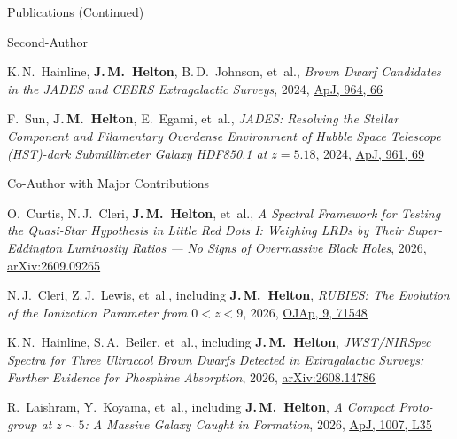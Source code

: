 \documentclass{JMH_CV}
\begin{document}
\begin{rSection}{Publications (Continued)}
\begin{rSubsection}{Second-Author}{}{}{}
\begin{etaremune}
    \item K.\,N.~Hainline, \textbf{J.\,M.~Helton}, B.\,D.~Johnson, et~al., \textit{Brown Dwarf Candidates in the JADES and CEERS Extragalactic Surveys}, 2024, \href{https://www.scixplorer.org/abs/2024ApJ...964...66H/abstract}{\ul{ApJ, 964, 66}}
    
    \item F.~Sun, \textbf{J.\,M.~Helton}, E.~Egami, et~al., \textit{JADES: Resolving the Stellar \mbox{Component} and Filamentary Overdense Environment of Hubble Space Telescope (HST)-dark \mbox{Submillimeter} Galaxy HDF850.1 at $\mathit{z = 5.18}$}, 2024, \href{https://www.scixplorer.org/abs/2024ApJ...961...69S/abstract}{\ul{ApJ, 961, 69}}

\end{etaremune}
\end{rSubsection}


\begin{rSubsection}{Co-Author with Major Contributions}{}{}{}
\begin{etaremune}

    \item O.~Curtis, N.\,J.~Cleri, \textbf{J.\,M.~Helton}, et~al., \textit{A Spectral Framework for Testing the Quasi-Star Hypothesis in Little Red Dots I: Weighing LRDs by Their Super-Eddington Luminosity Ratios --- No Signs of Overmassive Black Holes}, 2026, \href{https://www.scixplorer.org/abs/2026arXiv260909265C/abstract}{\ul{arXiv:2609.09265}}

    \item N.\,J.~Cleri, Z.\,J.~Lewis, et~al., including \textbf{J.\,M.~Helton}, \textit{RUBIES: The Evolution of the Ionization Parameter from $\mathit{0 < z < 9}$}, 2026, \href{https://www.scixplorer.org/abs/2026OJAp....971548C/abstract}{\ul{OJAp, 9, 71548}}

    \item K.\,N.~Hainline, S.\,A.~Beiler, et~al., including \textbf{J.\,M.~Helton}, \textit{JWST/NIRSpec Spectra for Three Ultracool Brown Dwarfs Detected in Extragalactic Surveys: Further Evidence for Phosphine Absorption}, 2026, \href{https://www.scixplorer.org/abs/2026arXiv260814786H/abstract}{\ul{arXiv:2608.14786}}

    \item R.~Laishram, Y.~Koyama, et~al., including \textbf{J.\,M.~Helton}, \textit{A Compact Proto-group at $\mathit{z \sim 5}$: A Massive Galaxy Caught in Formation}, 2026, \href{https://www.scixplorer.org/abs/2026ApJ..1007L..35L/abstract}{\ul{ApJ, 1007, L35}}


\end{etaremune}
\end{rSubsection}
\end{rSection}
\end{document}
